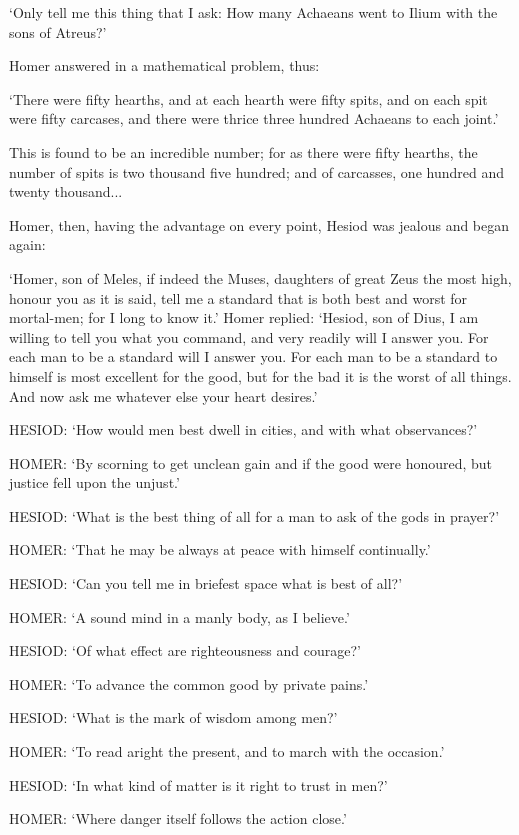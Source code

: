 ‘Only tell me this thing that I ask: How many Achaeans went to Ilium with
the sons of Atreus?’

Homer answered in a mathematical problem, thus:

‘There were fifty hearths, and at each hearth were fifty spits, and on
each spit were fifty carcases, and there were thrice three hundred Achaeans to
each joint.’

This is found to be an incredible number; for as there were fifty hearths, the
number of spits is two thousand five hundred; and of carcasses, one hundred and
twenty thousand...

Homer, then, having the advantage on every point, Hesiod was jealous and began
again:

‘Homer, son of Meles, if indeed the Muses, daughters of great Zeus the
most high, honour you as it is said, tell me a standard that is both best and
worst for mortal-men; for I long to know it.’ Homer replied:
‘Hesiod, son of Dius, I am willing to tell you what you command, and very
readily will I answer you. For each man to be a standard will I answer you. For
each man to be a standard to himself is most excellent for the good, but for
the bad it is the worst of all things. And now ask me whatever else your heart
desires.’

HESIOD: ‘How would men best dwell in cities, and with what
observances?’

HOMER: ‘By scorning to get unclean gain and if the good were honoured,
but justice fell upon the unjust.’

HESIOD: ‘What is the best thing of all for a man to ask of the gods in
prayer?’

HOMER: ‘That he may be always at peace with himself continually.’

HESIOD: ‘Can you tell me in briefest space what is best of all?’

HOMER: ‘A sound mind in a manly body, as I believe.’

HESIOD: ‘Of what effect are righteousness and courage?’

HOMER: ‘To advance the common good by private pains.’

HESIOD: ‘What is the mark of wisdom among men?’

HOMER: ‘To read aright the present, and to march with the
occasion.’

HESIOD: ‘In what kind of matter is it right to trust in men?’

HOMER: ‘Where danger itself follows the action close.’

